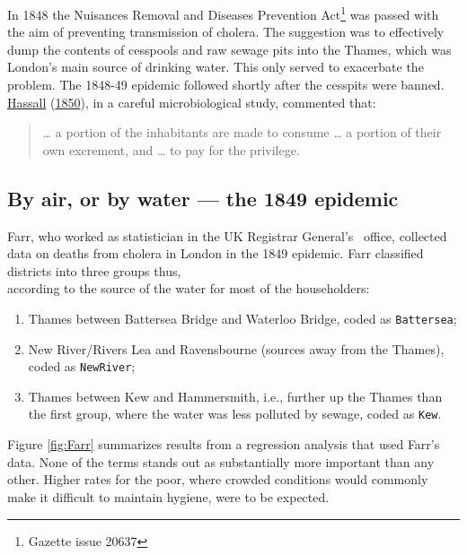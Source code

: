 \documentclass[
  10pt,
  b5paper]{book}
\providecommand{\tightlist}{%
  \setlength{\itemsep}{0pt}\setlength{\parskip}{0pt}}
\begin{document}
In 1848 the Nuisances Removal and Diseases Prevention
Act\footnote{Gazette issue 20637} was passed with the aim of
preventing transmission of cholera. The suggestion was to
effectively dump the contents of cesspools and raw
sewage pits into the Thames, which was London's main source of drinking water. This only served to exacerbate the problem.
The 1848-49 epidemic followed shortly after the cesspits
were banned. \protect\hyperlink{ref-hassall1850memoir}{Hassall} (\protect\hyperlink{ref-hassall1850memoir}{1850}), in a careful microbiological study, commented that:

\begin{quote}
\ldots{} a portion of the inhabitants are made to consume
\ldots{} a portion of their own excrement, and \ldots{} to pay
for the privilege.
\end{quote}

\hypertarget{by-air-or-by-water-the-1849-epidemic}{%
\subsection*{By air, or by water --- the 1849 epidemic}\label{by-air-or-by-water-the-1849-epidemic}}

Farr, who worked as statistician in the UK Registrar General's~
office, collected data on deaths from cholera in London in the
1849 epidemic. Farr classified districts into three groups thus,\\
according to the source of the water for most of the householders:

\begin{enumerate}
\def\labelenumi{\arabic{enumi})}
\tightlist
\item
  Thames between Battersea Bridge and Waterloo Bridge, coded
  as \texttt{Battersea};\\
\item
  New River/Rivers Lea and Ravensbourne (sources away from
  the Thames), coded as \texttt{NewRiver};\\
\item
  Thames between Kew and Hammersmith, i.e., further up the
  Thames than the first group, where the water was less polluted
  by sewage, coded as \texttt{Kew}.
\end{enumerate}

Figure \ref{fig:Farr} summarizes results from a regression
analysis that used Farr's data. None of the terms stands out
as substantially more important than any other. Higher rates
for the poor, where crowded conditions would commonly make
it difficult to maintain hygiene, were to be expected.
\end{document}
